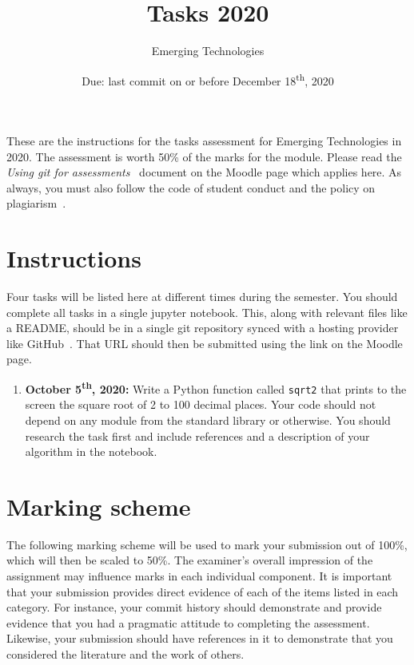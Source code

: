 \documentclass[a4paper, 12pt]{scrartcl}
\title{\vspace{-20mm}Tasks 2020}
\author{Emerging Technologies}
\date{Due: last commit on or before December 18\textsuperscript{th}, 2020\vspace{-6mm}}
\begin{document}
  
  
  \maketitle

  These are the instructions for the tasks assessment for Emerging Technologies in 2020.
  The assessment is worth 50\% of the marks for the module.
  Please read the \emph{Using git for assessments}~\cite{usinggit} document on the Moodle page which applies here.
  As always, you must also follow the code of student conduct and the policy on plagiarism~\cite{gmitqaf}.

  \section*{Instructions}
  Four tasks will be listed here at different times during the semester.
  You should complete all tasks in a single jupyter notebook.
  This, along with relevant files like a README, should be in a single git repository synced with a hosting provider like GitHub~\cite{github}.
  That URL should then be submitted using the link on the Moodle page.

  \begin{enumerate}
    \item
      \textbf{October 5\textsuperscript{th}, 2020:}
      Write a Python function called \texttt{sqrt2} that prints to the screen the square root of 2 to 100 decimal places.
      Your code should not depend on any module from the standard library or otherwise.
      You should research the task first and include references and a description of your algorithm in the notebook.
  \end{enumerate}


\newpage

\section*{Marking scheme}
  The following marking scheme will be used to mark your submission out of 100\%, which will then be scaled to 50\%.
  The examiner's overall impression of the assignment may influence marks in each individual component.
  It is important that your submission provides direct evidence of each of the items listed in each category.
  For instance, your commit history should demonstrate and provide evidence that you had a pragmatic attitude to completing the assessment.
  Likewise, your submission should have references in it to demonstrate that you considered the literature and the work of others.
\end{document}
